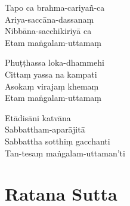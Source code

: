 \begin{paritta}
Tapo ca brahma-cariyañ-ca\\
Ariya-saccāna-dassanaṃ\\
Nibbāna-sacchikiriyā ca\\
Etam maṅgalam-uttamaṃ

Phuṭṭhassa loka-dhammehi\\
Cittaṃ yassa na kampati\\
Asokaṃ virajaṃ khemaṃ\\
Etam maṅgalam-uttamaṃ

Etādisāni katvāna\\
Sabbattham-aparājitā\\
Sabbattha sotthiṃ gacchanti\\
Tan-tesaṃ maṅgalam-uttaman'ti 

\end{paritta}

\section{Ratana Sutta}

